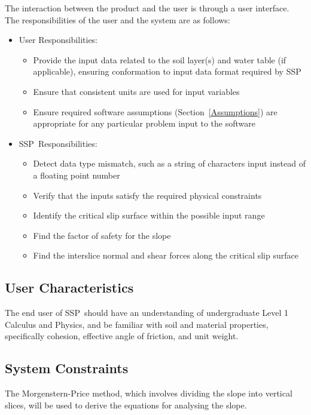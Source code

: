 \documentclass[12pt]{article}
\newcommand{\progname}{SSP}
\begin{document}
\noindent The interaction between the product and the user is through a user
interface.  The responsibilities of the user and the system are as follows:

\begin{itemize}
\item User Responsibilities:
  \begin{itemize}
  \item Provide the input data related to the soil layer(s) and water table (if 
  applicable), ensuring conformation to input data format required by \progname
  \item Ensure that consistent units are used for input variables
  \item Ensure required software assumptions (Section~\ref{Assumptions}) are
    appropriate for any particular problem input to the software
  \end{itemize}
\item \progname\ Responsibilities:
  \begin{itemize}
  \item Detect data type mismatch, such as a string of characters input instead
    of a floating point number
  \item Verify that the inputs satisfy the required physical constraints
  \item Identify the critical slip surface within the possible input range
  \item Find the factor of safety for the slope
  \item Find the interslice normal and shear forces along the critical slip 
  surface
  \end{itemize}
\end{itemize}

\subsection{User Characteristics}
\label{Sec:UserChar}
The end user of \progname\ should have an understanding of undergraduate
Level 1 Calculus and Physics, and be familiar with soil and material
properties, specifically cohesion, effective angle of 
friction, and unit weight.

\subsection{System Constraints}

The Morgenstern-Price method, which involves dividing the slope into vertical 
slices, will be used to derive the equations for analysing the slope. 
\end{document}
